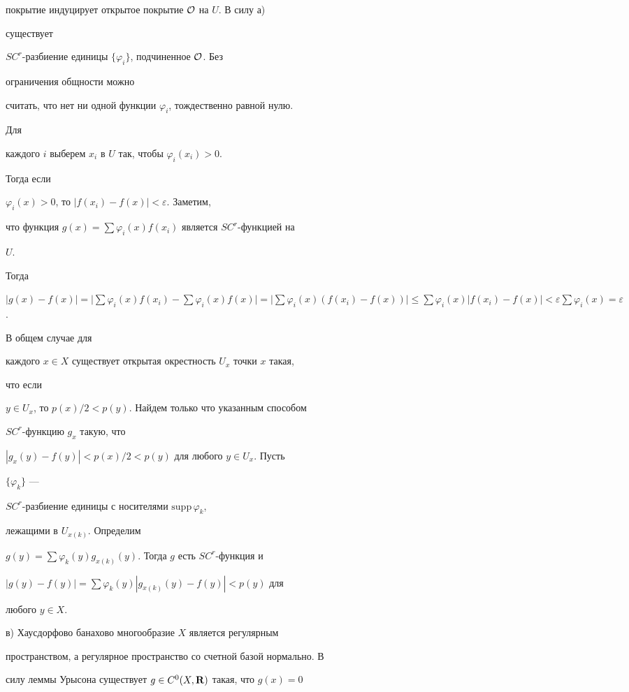 \begin{pf}
покрытие индуцирует открытое покрытие $\cal O$ на $U$. В силу а)


существует


$SC^r$-разбиение единицы $\{\varphi_i\}$, подчиненное $\cal O$. Без


ограничения общности можно


считать, что нет ни одной функции $\varphi_i$, тождественно равной нулю.


Для


каждого $i$ выберем $x_i$ в $U$ так, чтобы $\varphi_i(x_i)>0$.


Тогда если


$\varphi_i(x)>0$, то $|f(x_i)-f(x)|<\varepsilon$. Заметим,


что функция $g(x)=\sum\varphi_i(x)f(x_i)$ является $SC^r$-функцией на


$U$.


Тогда


$|g(x)-f(x)|=\bigl|\sum\varphi_i(x)f(x_i)-\sum\varphi_i(x)f(x)\bigr|=


\bigl|\sum\varphi_i(x)(f(x_i)-f(x))\bigr|\le\sum\varphi_i(x)


|f(x_i)-f(x)|<\varepsilon\sum\varphi_i(x)=\varepsilon$.


В общем случае для


каждого $x\in X$ существует открытая окрестность $U_x$ точки $x$ такая,


что если


$y\in U_x$, то $p(x)/2<p(y)$. Найдем только что указанным способом


$SC^r$-функцию $g_x$ такую, что


$|g_x(y)-f(y)|<p(x)/2<p(y)$ для любого $y\in U_x$. Пусть


$\{\varphi_k\}$ ---


$SC^r$-разбиение единицы с носителями $\text{supp}\,\varphi_k$,


лежащими в $U_{x(k)}$. Определим


$g(y)=\sum\varphi_k(y)g_{x(k)}(y)$. Тогда $g$ есть $SC^r$-функция и


$|g(y)-f(y)|=\sum\varphi_k(y)|g_{x(k)}(y)-f(y)|<p(y)$ для


любого $y\in X$.





в) Хаусдорфово банахово многообразие $X$ является регулярным


пространством, а регулярное пространство со счетной базой нормально. В


силу леммы Урысона существует $g\in C^0(X,\bold R)$ такая, что $g(x)=0$



\end{pf}
